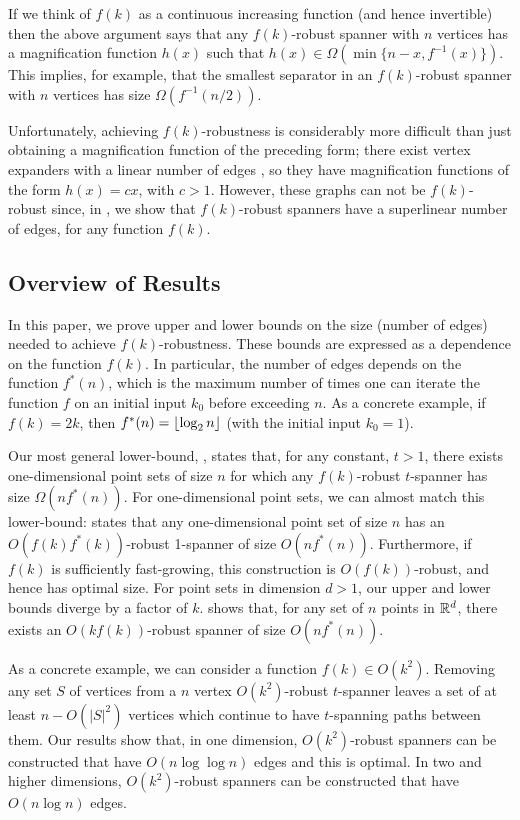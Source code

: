 \documentclass{sig-alternate}
\begin{document}
If we think of $f(k)$ as a continuous increasing function (and
hence invertible) then the above argument says that any $f(k)$-robust
spanner with $n$ vertices has a magnification function $h(x)$ such that
$h(x)\in\Omega(\min\{n-x,f^{-1}(x)\})$.  This implies, for example, that the
smallest separator in an $f(k)$-robust spanner with $n$ vertices has
size $\Omega(f^{-1}(n/2))$.

Unfortunately, achieving $f(k)$-robustness is considerably more
difficult than just obtaining a magnification function of the
preceding form; there exist vertex expanders with a linear number of
edges \cite{hlw06}, so they have magnification functions of the form
$h(x)=cx$, with $c>1$.  However, these graphs can not be $f(k)$-robust
since, in , we show that $f(k)$-robust
spanners have a superlinear number of edges, for any function $f(k)$.


\subsection{Overview of Results}

In this paper, we prove upper and lower bounds on the size (number of
edges) needed to achieve $f(k)$-robustness.
These bounds are expressed as a dependence on the function $f(k)$.
In particular, the number of edges depends on the function $f^*(n)$,
which is the maximum number of times one can iterate the function $f$ on
an initial input $k_0$ before exceeding $n$.  As a concrete example, if
$f(k)=2k$, then  $f^*(n)={\lfloor \log_2 n \rfloor}$ (with the initial input $k_0=1$).

Our most general lower-bound, , states
that, for any constant, $t>1$, there exists one-dimensional point
sets of size $n$ for which any $f(k)$-robust $t$-spanner has size
$\Omega(nf^*(n))$.  For one-dimensional point sets, we can almost match
this lower-bound:  states that any one-dimensional
point set of size $n$ has an $O(f(k)f^*(k))$-robust 1-spanner of size
$O(nf^*(n))$.  Furthermore, if $f(k)$ is sufficiently fast-growing,
this construction is $O(f(k))$-robust, and hence has optimal size.
For point sets in dimension $d>1$, our upper and lower bounds diverge
by a factor of $k$.   shows that, for any set of $n$ points
in $\mathbb{R}^d$, there exists an $O(kf(k))$-robust spanner of size $O(nf^*(n))$.

As a concrete example, we can consider a function $f(k)\in O(k^2)$.
Removing any set $S$ of vertices from a $n$ vertex $O(k^2)$-robust
$t$-spanner leaves a set of at least $n-O(|S|^2)$ vertices which continue
to have $t$-spanning paths between them.  Our results show that, in
one dimension, $O(k^2)$-robust spanners can be constructed that have
$O(n\log\log n)$ edges and this is optimal.  In two and higher dimensions,
$O(k^2)$-robust spanners can be constructed that have $O(n\log n)$ edges.
\end{document}
